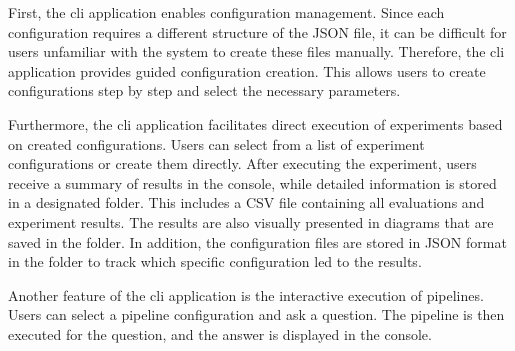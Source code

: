 First, the \gls{cli} application enables configuration management. Since each configuration requires a different structure of the JSON file, it can be difficult for users unfamiliar with the system to create these files manually. Therefore, the \gls{cli} application provides guided configuration creation. This allows users to create configurations step by step and select the necessary parameters.

Furthermore, the \gls{cli} application facilitates direct execution of experiments based on created configurations. Users can select from a list of experiment configurations or create them directly. After executing the experiment, users receive a summary of results in the console, while detailed information is stored in a designated folder. This includes a CSV file containing all evaluations and experiment results. The results are also visually presented in diagrams that are saved in the folder. In addition, the configuration files are stored in JSON format in the folder to track which specific configuration led to the results.

Another feature of the \gls{cli} application is the interactive execution of pipelines. Users can select a pipeline configuration and ask a question. The pipeline is then executed for the question, and the answer is displayed in the console.